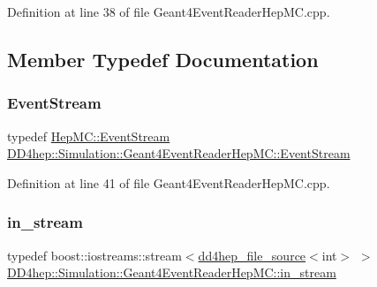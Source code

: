 Definition at line 38 of file Geant4\+Event\+Reader\+Hep\+M\+C.\+cpp.



\subsection{Member Typedef Documentation}
\hypertarget{class_d_d4hep_1_1_simulation_1_1_geant4_event_reader_hep_m_c_a260380eb48d2adb971aaade903a47da8}{}\label{class_d_d4hep_1_1_simulation_1_1_geant4_event_reader_hep_m_c_a260380eb48d2adb971aaade903a47da8} 
\subsubsection{\texorpdfstring{Event\+Stream}{EventStream}}
{\footnotesize\ttfamily typedef \hyperlink{class_d_d4hep_1_1_simulation_1_1_hep_m_c_1_1_event_stream}{Hep\+M\+C\+::\+Event\+Stream} \hyperlink{class_d_d4hep_1_1_simulation_1_1_geant4_event_reader_hep_m_c_a260380eb48d2adb971aaade903a47da8}{D\+D4hep\+::\+Simulation\+::\+Geant4\+Event\+Reader\+Hep\+M\+C\+::\+Event\+Stream}\hspace{0.3cm}{\ttfamily [private]}}



Definition at line 41 of file Geant4\+Event\+Reader\+Hep\+M\+C.\+cpp.

\hypertarget{class_d_d4hep_1_1_simulation_1_1_geant4_event_reader_hep_m_c_a1a456562e141e47288810fb708fa3815}{}\label{class_d_d4hep_1_1_simulation_1_1_geant4_event_reader_hep_m_c_a1a456562e141e47288810fb708fa3815} 
\subsubsection{\texorpdfstring{in\+\_\+stream}{in\_stream}}
{\footnotesize\ttfamily typedef boost\+::iostreams\+::stream$<$\hyperlink{class_d_d4hep_1_1dd4hep__file__source}{dd4hep\+\_\+file\+\_\+source}$<$int$>$ $>$ \hyperlink{class_d_d4hep_1_1_simulation_1_1_geant4_event_reader_hep_m_c_a1a456562e141e47288810fb708fa3815}{D\+D4hep\+::\+Simulation\+::\+Geant4\+Event\+Reader\+Hep\+M\+C\+::in\+\_\+stream}\hspace{0.3cm}{\ttfamily [private]}}



